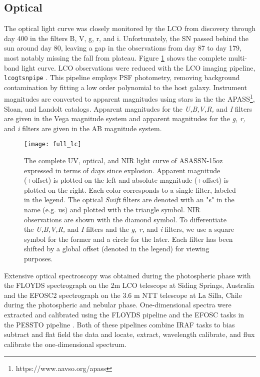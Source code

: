 \documentclass[a4paper,fleqn,usenatbib]{mnras}
\begin{document}
\subsection{Optical \label{subsec:optical}}
The optical light curve was closely monitored by the LCO from discovery through day 400 in the filters B, V, g, r, and i. 
Unfortunately, the SN passed behind the sun around day 80, leaving a gap in the observations from day 87 to day 179, most notably missing the fall from plateau.
Figure \ref{fig:LC} shows the complete multi-band light curve.
LCO observations were reduced with the LCO imaging pipeline, {\tt lcogtsnpipe} \citep{2016valenti}. 
This pipeline employs PSF photometry, removing background contamination by fitting a low order polynomial to the host galaxy.
Instrument magnitudes are converted to apparent magnitudes using stars in the the APASS\footnote{https://www.aavso.org/apass}, Sloan, and Landolt catalogs.
Apparent magnitudes for the {\it U,B,V,R,} and {\it I} filters are given in the Vega magnitude system and apparent magnitudes for  the {\it g, r,} and {\it i} filters are given in the AB magnitude system.
\begin{figure}
\begin{center}
\texttt{[image: full\_lc]}
\caption{The complete UV, optical, and NIR light curve of ASASSN-15oz expressed in terms of days since explosion.
Apparent magnitude (+offset) is plotted on the left and absolute magnitude (+offset) is plotted on the right. 
Each color corresponds to a single filter, labeled in the legend. 
The optical {\it Swift} filters are denoted with an "s" in the name (e.g. us) and plotted with the triangle symbol.
NIR observations are shown with the diamond symbol.
To differentiate the {\it U,B,V,R,} and {\it I} filters and the {\it g, r,} and {\it i} filters, we use a square symbol for the former and a circle for the later.
Each filter has been shifted by a global offset (denoted in the legend) for viewing purposes.}
\label{fig:LC}
\end{center}
\end{figure}

Extensive optical spectroscopy was obtained during the photospheric phase with the FLOYDS spectrograph \citep{2013brown} on the 2m LCO telescope at Siding Springs, Australia and the EFOSC2 spectrograph \citep{1984buzzoni} on the 3.6 m NTT telescope at La Silla, Chile during the photospheric and nebular phase. 
One-dimensional spectra were extracted and calibrated using the FLOYDS pipeline \citep{2014valenti} and the EFOSC tasks in the PESSTO pipeline \citep{2015smartt}. 
Both of these pipelines combine IRAF tasks to bias subtract and flat field the data and locate, extract, wavelength calibrate, and flux calibrate the one-dimensional spectrum.
\end{document}
